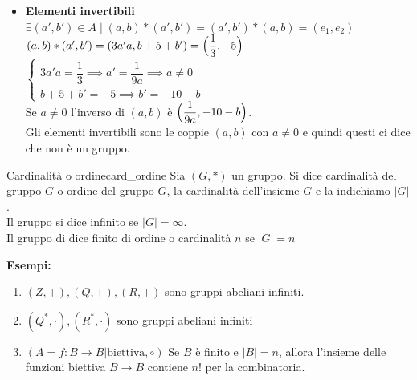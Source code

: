 \documentclass[12pt, letterpaper]{report}
\newcounter{definition}
\newcommand{\nmu}{}
\begin{document}
\begin{itemize}
			\item \textbf{Elementi invertibili} \\
			$\exists (a', b') \in A \mid (a,b) * (a', b') = (a', b') * (a,b) = (e_1, e_2)$ \\
			$(a,b) * (a',b') = (3a'a, b + 5 + b') = \Bigl(\dfrac{1}{3}, -5\Bigl)$ \\
			$\begin{cases}
				3a'a = \dfrac{1}{3} \implies a' = \dfrac{1}{9a} \implies a \neq 0 \\
				b + 5 + b' = -5 \implies b' = -10 - b
			\end{cases}$ \\
			Se $a \neq 0$ l'inverso di $(a, b)$ è $\Bigl(\dfrac{1}{9a}, -10 - b\Bigl)$. \\
			Gli elementi invertibili sono le coppie $(a,b)$ con $a \neq 0$ e quindi questi ci dice che non è un gruppo.
		\end{itemize}
		\begin{definition}{\nmu Cardinalità o ordine}{card_ordine}
			Sia $(G, *)$ un gruppo. Si dice cardinalità del gruppo $G$ o ordine del gruppo $G$, la cardinalità dell'insieme $G$ e la indichiamo $|G|$. \\
			Il gruppo si dice infinito se $|G| = \infty$. \\
			Il gruppo di dice finito di ordine o cardinalità $n$ se $|G|=n$
		\end{definition}
		\textbf{Esempi:}
		\begin{enumerate}
			\item $(Z, +), (Q, +), (R, +)$ sono gruppi abeliani infiniti.
			\item $(Q^*, \cdot), (R^*, \cdot)$ sono gruppi abeliani infiniti
			\item $(A={f:B \to B |\text{biettiva}}, \circ)$ Se $B$ è finito e $|B| = n$, allora l'insieme delle funzioni biettiva $B \to B$ contiene $n!$ per la combinatoria.
		\end{enumerate}
\end{document}
